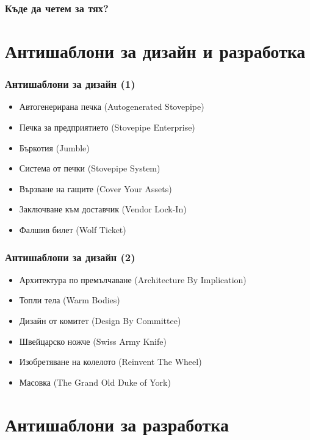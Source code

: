 \documentclass[alsotrans]{beamerswitch}
\begin{document}
\begin{frame}
  \frametitle{Къде да четем за тях?}
  \nocite{*}
  
  
\end{frame}

\section{Антишаблони за дизайн и разработка}

\begin{frame}
  \frametitle{Антишаблони за дизайн (1)}

  \begin{itemize}[<+->]
  \item Автогенерирана печка (Autogenerated Stovepipe)
  \item Печка за предприятието (Stovepipe Enterprise)
  \item Бъркотия (Jumble)
  \item Система от печки (Stovepipe System)
  \item Вързване на гащите (Cover Your Assets)
  \item Заключване към доставчик (Vendor Lock-In)
  \item Фалшив билет (Wolf Ticket)
  \end{itemize}
\end{frame}

\begin{frame}
  \frametitle{Антишаблони за дизайн (2)}

  \begin{itemize}[<+->]
  \item Архитектура по премълчаване (Architecture By Implication)
  \item Топли тела (Warm Bodies)
  \item Дизайн от комитет (Design By Committee)
  \item Швейцарско ножче (Swiss Army Knife)
  \item Изобретяване на колелото (Reinvent The Wheel)
  \item Масовка (The Grand Old Duke of York)
  \end{itemize}
\end{frame}

\section{Антишаблони за разработка}
\end{document}
